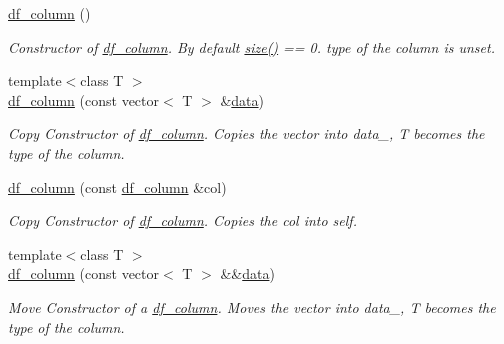 \begin{DoxyCompactItemize}
\item 
\hyperlink{classboost_1_1numeric_1_1ublas_1_1df__column_a73d49d7f0ad1d1205cfecfa8eec795e8}{df\+\_\+column} ()\hypertarget{classboost_1_1numeric_1_1ublas_1_1df__column_a73d49d7f0ad1d1205cfecfa8eec795e8}{}\label{classboost_1_1numeric_1_1ublas_1_1df__column_a73d49d7f0ad1d1205cfecfa8eec795e8}

\begin{DoxyCompactList}\small\item\em Constructor of \hyperlink{classboost_1_1numeric_1_1ublas_1_1df__column}{df\+\_\+column}. By default {\ttfamily \hyperlink{classboost_1_1numeric_1_1ublas_1_1df__column_ae604a0d9f7118a91615df1bcb4a7f823}{size()}} == 0. type of the column is unset. \end{DoxyCompactList}\item 
{\footnotesize template$<$class T $>$ }\\\hyperlink{classboost_1_1numeric_1_1ublas_1_1df__column_a823796ec0d98231f2ee9b086b2c61939}{df\+\_\+column} (const vector$<$ T $>$ \&\hyperlink{classboost_1_1numeric_1_1ublas_1_1df__column_a4affb80868ab80aabf96f0be2fd613c7}{data})
\begin{DoxyCompactList}\small\item\em Copy Constructor of \hyperlink{classboost_1_1numeric_1_1ublas_1_1df__column}{df\+\_\+column}. Copies the vector into data\+\_\+, T becomes the type of the column. \end{DoxyCompactList}\item 
\hyperlink{classboost_1_1numeric_1_1ublas_1_1df__column_a09d5a761b2f2ea3c15557a76e66040f3}{df\+\_\+column} (const \hyperlink{classboost_1_1numeric_1_1ublas_1_1df__column}{df\+\_\+column} \&col)
\begin{DoxyCompactList}\small\item\em Copy Constructor of \hyperlink{classboost_1_1numeric_1_1ublas_1_1df__column}{df\+\_\+column}. Copies the col into self. \end{DoxyCompactList}\item 
{\footnotesize template$<$class T $>$ }\\\hyperlink{classboost_1_1numeric_1_1ublas_1_1df__column_a41b4b0c0a2046d30ef669ba21bace5e4}{df\+\_\+column} (const vector$<$ T $>$ \&\&\hyperlink{classboost_1_1numeric_1_1ublas_1_1df__column_a4affb80868ab80aabf96f0be2fd613c7}{data})
\begin{DoxyCompactList}\small\item\em Move Constructor of a \hyperlink{classboost_1_1numeric_1_1ublas_1_1df__column}{df\+\_\+column}. Moves the vector into data\+\_\+, T becomes the type of the column. \end{DoxyCompactList}\item 

\end{DoxyCompactItemize}
